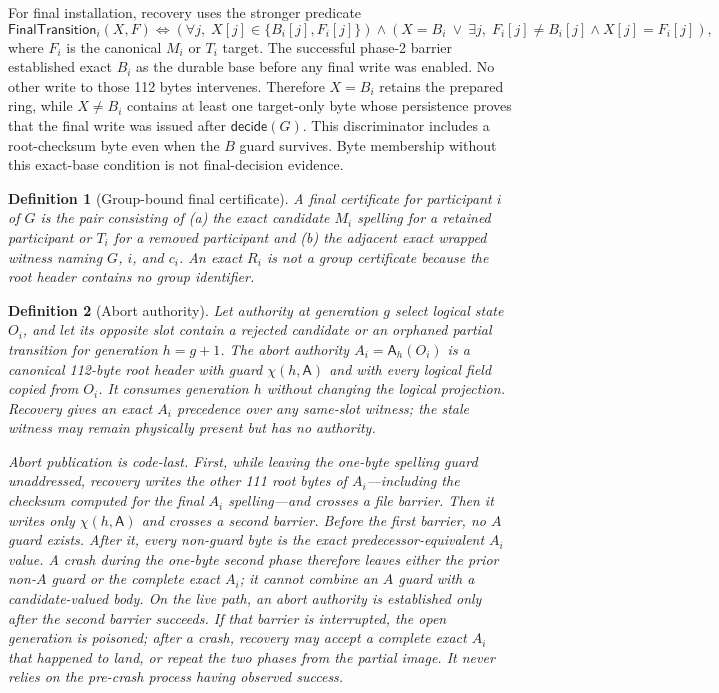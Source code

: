 \documentclass[10pt,twocolumn]{article}
\newtheorem{definition}{Definition}
\theoremstyle{remark}
\newcommand{\Abort}{\mathsf{A}}
\begin{document}
For final installation, recovery uses the stronger predicate
\[
  \mathsf{FinalTransition}_i(X,F) \iff
  \left(\forall j,\;X[j]\in\{B_i[j],F_i[j]\}\right)
  \land \left(X=B_i\ \lor\ \exists j,\;F_i[j]\ne B_i[j]\land X[j]=F_i[j]\right),
\]
where $F_i$ is the canonical $M_i$ or $T_i$ target. The successful phase-2 barrier established
exact $B_i$ as the durable base before any final write was enabled. No other write to those 112
bytes intervenes. Therefore $X=B_i$ retains the prepared ring, while $X\ne B_i$ contains at least
one target-only byte whose persistence proves that the final write was issued after
$\mathsf{decide}(G)$. This discriminator includes a root-checksum byte even when the $B$ guard
survives. Byte membership without this exact-base condition is not final-decision evidence.

\begin{definition}[Group-bound final certificate]\label{def:certificate}
A final certificate for participant $i$ of $G$ is the pair consisting of (a) the exact candidate
$M_i$ spelling for a retained participant or $T_i$ for a removed participant and (b) the adjacent
exact wrapped witness naming $G$, $i$, and $c_i$. An exact $R_i$ is not a group certificate because
the root header contains no group identifier.
\end{definition}

\begin{definition}[Abort authority]\label{def:rollback-fence}
Let authority at generation $g$ select logical state $O_i$, and let its opposite slot contain a
rejected candidate or an orphaned partial transition for generation $h=g+1$.  The abort authority
$A_i=\Abort_h(O_i)$ is a canonical 112-byte root header with guard $\chi(h,\Abort)$ and with every
logical field copied from $O_i$.  It consumes generation $h$ without changing the logical
projection.  Recovery gives an exact $A_i$ precedence over any same-slot witness; the stale witness
may remain physically present but has no authority.

Abort publication is code-last. First, while leaving the one-byte spelling guard unaddressed,
recovery writes the other 111 root bytes of $A_i$---including the checksum computed for the final
$A_i$ spelling---and crosses a file barrier. Then it writes only $\chi(h,\Abort)$ and crosses a
second barrier. Before the first barrier, no $A$ guard exists. After it, every non-guard byte is the
exact predecessor-equivalent $A_i$ value. A crash during the one-byte second phase therefore leaves
either the prior non-$A$ guard or the complete exact $A_i$; it cannot combine an $A$ guard with a
candidate-valued body. On the live path, an abort authority is established only after the second
barrier succeeds. If that barrier is interrupted, the open generation is poisoned; after a crash,
recovery may accept a complete exact $A_i$ that happened to land, or repeat the two phases from the
partial image. It never relies on the pre-crash process having observed success.
\end{definition}
\end{document}

